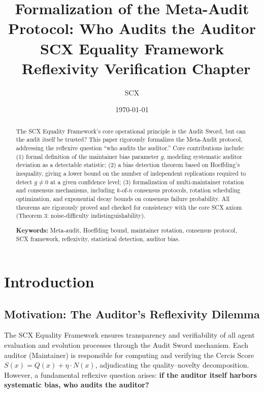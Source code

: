\documentclass[11pt,a4paper]{article}
\title{
    \textbf{Formalization of the Meta-Audit Protocol: Who Audits the Auditor}\\[0.5em]
    \normalsize SCX Equality Framework \textemdash\ Reflexivity Verification Chapter
}
\author{SCX}
\date{\today}
\theoremstyle{definition}
\begin{document}
\maketitle

\begin{abstract}
\noindent
The SCX Equality Framework's core operational principle is the Audit Sword, but can the audit itself be trusted? This paper rigorously formalizes the Meta-Audit protocol, addressing the reflexive question ``who audits the auditor.'' Core contributions include: (1) formal definition of the maintainer bias parameter $g$, modeling systematic auditor deviation as a detectable statistic; (2) a bias detection theorem based on Hoeffding's inequality, giving a lower bound on the number of independent replications required to detect $g \neq 0$ at a given confidence level; (3) formalization of multi-maintainer rotation and consensus mechanisms, including $k$-of-$n$ consensus protocols, rotation scheduling optimization, and exponential decay bounds on consensus failure probability. All theorems are rigorously proved and checked for consistency with the core SCX axiom (Theorem 3: noise-difficulty indistinguishability).

\vspace{0.5em}
\noindent
\textbf{Keywords:} Meta-audit, Hoeffding bound, maintainer rotation, consensus protocol, SCX framework, reflexivity, statistical detection, auditor bias.
\end{abstract}

\section{Introduction}

\subsection{Motivation: The Auditor's Reflexivity Dilemma}

\noindent
The SCX Equality Framework ensures transparency and verifiability of all agent evaluation and evolution processes through the Audit Sword mechanism. Each auditor (Maintainer) is responsible for computing and verifying the Cercis Score $S(x) = Q(x) + \eta \cdot N(x)$, adjudicating the quality--novelty decomposition. However, a fundamental reflexive question arises: \textbf{if the auditor itself harbors systematic bias, who audits the auditor?}
\end{document}
